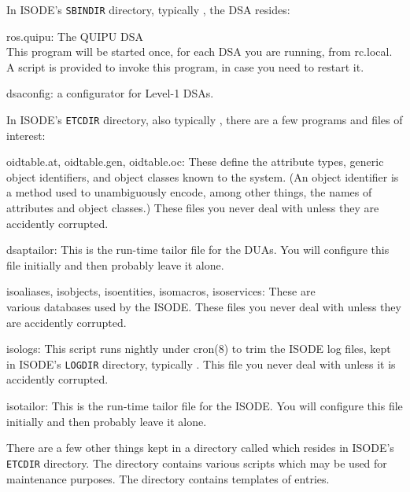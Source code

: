 In ISODE's \verb"SBINDIR" directory,
typically ,
the DSA resides:
\begin{describe}
\item[ros.quipu:]	The QUIPU DSA\\
			This program will be started once, for each DSA you
			are running, from rc.local.
			A script is provided to invoke this program,
			in case you need to restart it.

\item[dsaconfig:]	a configurator for Level-1 DSAs.
\end{describe}
In ISODE's \verb"ETCDIR" directory,
also typically ,
there are a few programs and files of interest:
\begin{describe}\sloppy
\item[oidtable.at, oidtable.gen, oidtable.oc:]
			These define the attribute types,
			generic object identifiers,
			and object classes known to the system.
			(An object identifier is a method used to unambiguously
			encode, among other things,
			the names of attributes and object classes.)
			These files you never deal with unless they are
			accidently corrupted.
			
\item[dsaptailor:]	This is the run-time tailor file for the DUAs.
			You will configure this file initially and then
			probably leave it alone.


\item[isoaliases, isobjects, isoentities, isomacros, isoservices:]
			These are \\ %
			various databases used by the ISODE.
			These files you never deal with unless they are
			accidently corrupted.

\item[isologs:]		This script runs nightly under \man cron(8) to
			trim the ISODE log files, kept in ISODE's \verb"LOGDIR"
			directory,
			typically .
			This file you never deal with unless it is
			accidently corrupted.

\item[isotailor:]	This is the run-time tailor file for the ISODE.
			You will configure this file initially and then
			probably leave it alone.
\end{describe}
There are a few other things kept in a directory called 
which resides in ISODE's \verb"ETCDIR" directory.
The  directory contains various scripts which may be used for
maintenance purposes.
The  directory contains templates of entries.


